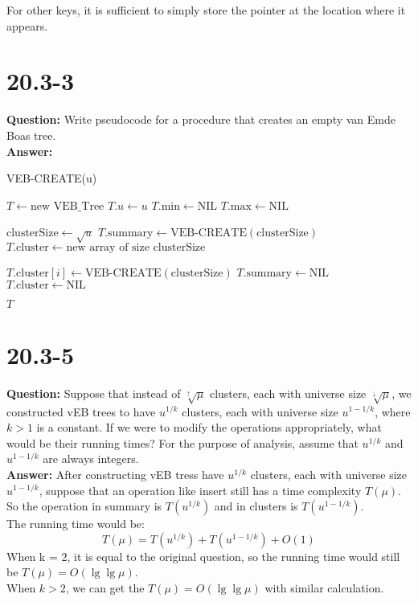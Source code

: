 \documentclass[12pt]{article}
\begin{document}
For other keys, it is sufficient to simply store the pointer at the location where it appears.
\section{20.3-3}
\textbf{Question: }Write pseudocode for a procedure that creates an empty van Emde Boas tree.\\
\textbf{Answer: }
\begin{algorithm}
\caption{VEB-CREATE(u)}
\begin{algorithmic}[1]
    \State $T \gets \text{new VEB\_Tree}$
    \State $T.u \gets u$
    \State $T.\text{min} \gets \text{NIL}$
    \State $T.\text{max} \gets \text{NIL}$
    
        \State $\text{clusterSize} \gets \sqrt{u}$
        \State $T.\text{summary} \gets \text{VEB-CREATE}(\text{clusterSize})$
        \State $T.\text{cluster} \gets \text{new array of size } \text{clusterSize}$
        
            \State $T.\text{cluster}[i] \gets \text{VEB-CREATE}(\text{clusterSize})$
        \EndFor
    \Else
        \State $T.\text{summary} \gets \text{NIL}$
        \State $T.\text{cluster} \gets \text{NIL}$
    \EndIf
    
    \State \Return $T$
\EndProcedure
\end{algorithmic}
\end{algorithm}
\section{20.3-5}
\textbf{Question: } 
Suppose that instead of $\sqrt[↑]{\mu}$ clusters, each with universe size $\sqrt[↓]{\mu}$, we constructed vEB trees to have $u^{1/k}$ clusters, each with universe size $u^{1 - 1/k}$, where $k > 1$ is a constant. If we were to modify the operations appropriately, what would be their running times? For the purpose of analysis, assume that $u^{1/k}$ and $u^{1 - 1/k}$ are always integers.\\
\textbf{Answer:}
After constructing vEB tress have  $u^{1/k}$ clusters, each with universe size $u^{1 - 1/k}$, suppose that an operation like insert still has a time complexity $T(\mu)$.\\
So the operation in summary is $T(u^{1/k})$ and in clusters is $T(u^{1 - 1/k})$.\\
The running time would be:
\[
T(\mu) = T(u^{1/k}) + T(u^{1 - 1/k}) + O(1)
\]
When k = 2, it is equal to the original question, so the running time would still be $T(\mu)= O(\lg {\lg \mu})$.\\
When $k > 2$, we can get the $T(\mu)= O(\lg {\lg \mu})$ with similar calculation.
\end{document}
